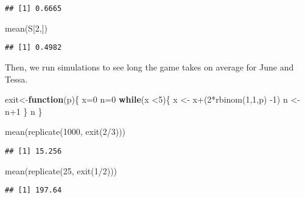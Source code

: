 \documentclass[
]{article}
\newenvironment{Shaded}{\begin{snugshade}}{\end{snugshade}}
\newcommand{\ControlFlowTok}[1]{\textcolor[rgb]{0.13,0.29,0.53}{\textbf{#1}}}
\newcommand{\DecValTok}[1]{\textcolor[rgb]{0.00,0.00,0.81}{#1}}
\newcommand{\FunctionTok}[1]{\textcolor[rgb]{0.00,0.00,0.00}{#1}}
\newcommand{\NormalTok}[1]{#1}
\newcommand{\OtherTok}[1]{\textcolor[rgb]{0.56,0.35,0.01}{#1}}
\newcommand{\SpecialCharTok}[1]{\textcolor[rgb]{0.00,0.00,0.00}{#1}}
\theoremstyle{definition}
\theoremstyle{definition}
\theoremstyle{definition}
\theoremstyle{definition}
\theoremstyle{remark}
\begin{document}
\begin{verbatim}
## [1] 0.6665
\end{verbatim}

\begin{Shaded}
\begin{Highlighting}[]
\FunctionTok{mean}\NormalTok{(S[}\DecValTok{2}\NormalTok{,])}
\end{Highlighting}
\end{Shaded}

\begin{verbatim}
## [1] 0.4982
\end{verbatim}

Then, we run simulations to see long the game takes on average for June and Tessa.

\begin{Shaded}
\begin{Highlighting}[]
\NormalTok{exit}\OtherTok{\textless{}{-}}\ControlFlowTok{function}\NormalTok{(p)\{}
\NormalTok{  x}\OtherTok{=}\DecValTok{0}
\NormalTok{  n}\OtherTok{=}\DecValTok{0}
  \ControlFlowTok{while}\NormalTok{(x }\SpecialCharTok{\textless{}}\DecValTok{5}\NormalTok{)\{}
\NormalTok{    x }\OtherTok{\textless{}{-}}\NormalTok{ x}\SpecialCharTok{+}\NormalTok{(}\DecValTok{2}\SpecialCharTok{*}\FunctionTok{rbinom}\NormalTok{(}\DecValTok{1}\NormalTok{,}\DecValTok{1}\NormalTok{,p) }\SpecialCharTok{{-}}\DecValTok{1}\NormalTok{)}
\NormalTok{  n }\OtherTok{\textless{}{-}}\NormalTok{ n}\SpecialCharTok{+}\DecValTok{1}
\NormalTok{  \}}
\NormalTok{  n}
\NormalTok{\}}

\FunctionTok{mean}\NormalTok{(}\FunctionTok{replicate}\NormalTok{(}\DecValTok{1000}\NormalTok{, }\FunctionTok{exit}\NormalTok{(}\DecValTok{2}\SpecialCharTok{/}\DecValTok{3}\NormalTok{)))}
\end{Highlighting}
\end{Shaded}

\begin{verbatim}
## [1] 15.256
\end{verbatim}

\begin{Shaded}
\begin{Highlighting}[]
\FunctionTok{mean}\NormalTok{(}\FunctionTok{replicate}\NormalTok{(}\DecValTok{25}\NormalTok{, }\FunctionTok{exit}\NormalTok{(}\DecValTok{1}\SpecialCharTok{/}\DecValTok{2}\NormalTok{)))}
\end{Highlighting}
\end{Shaded}

\begin{verbatim}
## [1] 197.64
\end{verbatim}
\end{document}
